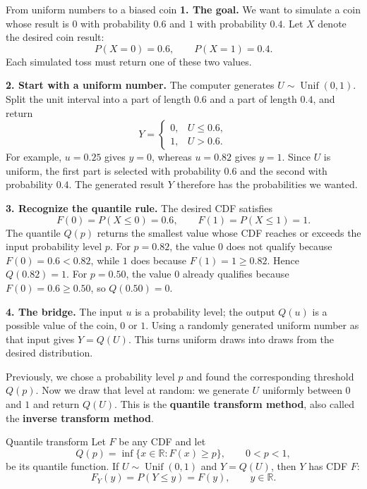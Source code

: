 \documentclass[a4paper,12pt,oneside]{report}
\begin{document}
\begin{framedexample}{From uniform numbers to a biased coin}
\label{ex:quantile-transform-bridge}
\textbf{1. The goal.} We want to simulate a coin whose result is
$0$ with probability $0.6$ and $1$ with probability $0.4$.
Let $X$ denote the desired coin result:
\[
  P(X=0)=0.6,\qquad P(X=1)=0.4.
\]
Each simulated toss must return one of these two values.

\textbf{2. Start with a uniform number.} The computer generates
$U\sim\operatorname{Unif}(0,1)$. Split the unit interval into a
part of length $0.6$ and a part of length $0.4$, and return
\[
  Y=
  \begin{cases}
    0, & U\leq0.6,\\
    1, & U>0.6.
  \end{cases}
\]
For example, $u=0.25$ gives $y=0$, whereas $u=0.82$ gives $y=1$.
Since $U$ is uniform, the first part is selected with probability
$0.6$ and the second with probability $0.4$. The generated result
$Y$ therefore has the probabilities we wanted.

\textbf{3. Recognize the quantile rule.} The desired CDF satisfies
\[
  F(0)=P(X\leq0)=0.6,\qquad F(1)=P(X\leq1)=1.
\]
The quantile $Q(p)$ returns the smallest value whose CDF reaches
or exceeds the input probability level $p$.
For $p=0.82$, the value $0$ does not qualify because
$F(0)=0.6<0.82$, while $1$ does because $F(1)=1\geq0.82$.
Hence $Q(0.82)=1$. For $p=0.50$, the value $0$ already qualifies
because $F(0)=0.6\geq0.50$, so $Q(0.50)=0$.

\textbf{4. The bridge.} The input $u$ is a probability level;
the output $Q(u)$ is a possible value of the coin, $0$ or $1$.
Using a randomly generated uniform number as that input gives
$Y=Q(U)$. This turns uniform draws into draws from the desired
distribution.
\end{framedexample}

\clearpage
Previously, we chose a probability level $p$ and found the
corresponding threshold $Q(p)$. Now we draw that level at random:
we generate $U$ uniformly between $0$ and $1$ and return $Q(U)$.
This is the \textbf{quantile transform method}, also called the
\textbf{inverse transform method}.

\begin{framedprop}{Quantile transform}
\label{prop:quantile-transform}
Let $F$ be any CDF and let
\[
  Q(p)=\inf\{x\in\mathbb R:F(x)\geq p\},\qquad 0<p<1,
\]
be its quantile function. If $U\sim\operatorname{Unif}(0,1)$ and
$Y=Q(U)$, then $Y$ has CDF $F$:
\[
  F_Y(y)=P(Y\leq y)=F(y),\qquad y\in\mathbb R.
\]
\end{framedprop}
\end{document}
